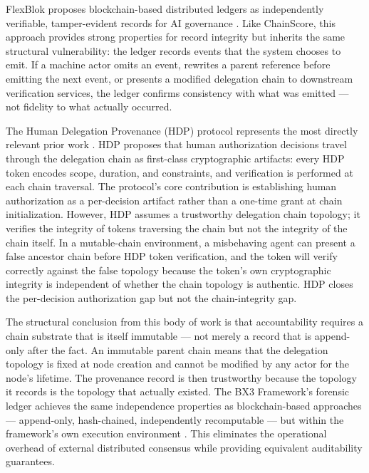 FlexBlok proposes blockchain-based distributed ledgers as independently verifiable, tamper-evident records for AI governance \cite{blockchain_ai_governance}. Like ChainScore, this approach provides strong properties for record integrity but inherits the same structural vulnerability: the ledger records events that the system chooses to emit. If a machine actor omits an event, rewrites a parent reference before emitting the next event, or presents a modified delegation chain to downstream verification services, the ledger confirms consistency with what was emitted --- not fidelity to what actually occurred.

The Human Delegation Provenance (HDP) protocol represents the most directly relevant prior work \cite{hdp2025arxiv}. HDP proposes that human authorization decisions travel through the delegation chain as first-class cryptographic artifacts: every HDP token encodes scope, duration, and constraints, and verification is performed at each chain traversal. The protocol's core contribution is establishing human authorization as a per-decision artifact rather than a one-time grant at chain initialization. However, HDP assumes a trustworthy delegation chain topology; it verifies the integrity of tokens traversing the chain but not the integrity of the chain itself. In a mutable-chain environment, a misbehaving agent can present a false ancestor chain before HDP token verification, and the token will verify correctly against the false topology because the token's own cryptographic integrity is independent of whether the chain topology is authentic. HDP closes the per-decision authorization gap but not the chain-integrity gap.

The structural conclusion from this body of work is that accountability requires a chain substrate that is itself immutable --- not merely a record that is append-only after the fact. An immutable parent chain means that the delegation topology is fixed at node creation and cannot be modified by any actor for the node's lifetime. The provenance record is then trustworthy because the topology it records is the topology that actually existed. The BX3 Framework's forensic ledger achieves the same independence properties as blockchain-based approaches --- append-only, hash-chained, independently recomputable --- but within the framework's own execution environment \cite{bx3framework}. This eliminates the operational overhead of external distributed consensus while providing equivalent auditability guarantees.

